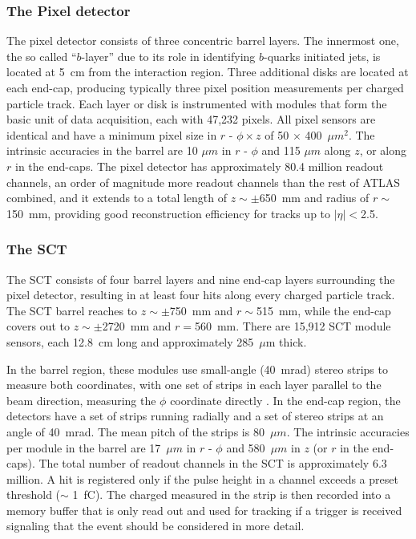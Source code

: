 \subsubsection{The Pixel detector}

The pixel detector consists of three concentric barrel layers. The innermost one, the so called ``$b$-layer'' due to its role in identifying $b$-quarks initiated jets, is located at 5~cm from the interaction region. Three additional disks are located at each end-cap, producing typically three pixel position measurements per charged particle track.  Each layer or disk is instrumented with modules that form the basic unit of data acquisition, each with 47,232 pixels.  All pixel sensors are identical and have a minimum pixel size in $r$ - $\phi \times z$ of 50 $\times$ 400~$\mu m^2$. The intrinsic accuracies in the barrel are 10 $\mu m$ in $r$ - $\phi$ and 115 $\mu m$ along $z$, or along $r$ in the end-caps. The pixel detector has approximately 80.4 million readout channels, an order of magnitude more readout channels than the rest of ATLAS combined, and it extends to a total length of $z \sim \pm$650~mm and radius of $r \sim$150~mm, providing good reconstruction efficiency for tracks up to $|\eta| <$2.5.

 
\subsubsection{The SCT}


The SCT consists of four barrel layers and nine end-cap layers surrounding the pixel detector, resulting in at least four hits along every charged particle track.  The SCT barrel reaches to $z\sim \pm$750~mm and $r \sim $515~mm, while the end-cap covers out to $z\sim \pm$2720~mm and $r =$560~mm.  There are 15,912 SCT module sensors, each 12.8~cm long and approximately 285~$\mu $m thick. 

In the barrel region, these modules use small-angle (40~mrad) stereo strips to measure both coordinates, with one set of strips in each layer parallel to the beam direction, measuring the $\phi$ coordinate directly . In the end-cap region, the detectors have a set of strips running radially and a set of stereo strips at an angle of 40~mrad. The mean pitch of the strips is 80~$\mu m$. The intrinsic accuracies per module in the barrel are 17~$\mu m$ in $r$ - $\phi $ and 580~$\mu m$ in $z$ (or $r$ in the end-caps). The total number of readout channels in the SCT is approximately 6.3 million.  A hit is registered only if the pulse height in a channel exceeds a preset threshold ($\sim $ 1~fC). The charged measured in the strip is then recorded into a memory buffer that is only read out and used for tracking if a trigger is received signaling that the event should be considered in more detail.


